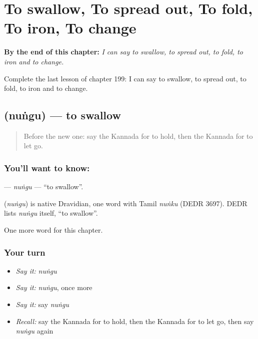 
\chapter{To swallow, To spread out, To fold, To iron, To change}
\label{ch:ka-to-swallow-to-spread-out-to-fold-to-iron-to-change}

\begin{chapteropening}
\textbf{By the end of this chapter:} \emph{I can say to swallow, to spread out, to fold, to iron and to change.}

Complete the last lesson of chapter 199: I can say to swallow, to spread out, to fold, to iron and to change.
\end{chapteropening}

\section[\texorpdfstring{\kn{ನುಂಗು} (nuṅgu)}{ನುಂಗು (nuṅgu)}]{ (nuṅgu) — to swallow}

\label{lesson:KA-C199-nungu}



\begin{quote}
Before the new one: say the Kannada for to hold, then the Kannada for to let go.
\end{quote}

\subsection*{You'll want to know: }
\textbf{} — \emph{nuṅgu} — \textquotedblleft{}to swallow\textquotedblright{}.

\begin{cousinweb}
\textbf{} (\emph{nuṅgu}) is native Dravidian, one word with Tamil \emph{nuṅku} (DEDR 3697). DEDR lists \emph{nuṅgu} itself, \textquotedblleft{}to swallow\textquotedblright{}.
\end{cousinweb}

\begin{grammarlens}[title={What you've built}]
One more word for this chapter.
\end{grammarlens}

\subsection*{Your turn}
\begin{itemize}
\raggedright
  \item \emph{Say it:} \emph{nuṅgu}
  \item \emph{Say it:} \emph{nuṅgu}, once more
  \item \emph{Say it:} say \emph{nuṅgu}
  \item \emph{Recall:} say the Kannada for to hold, then the Kannada for to let go, then say \emph{nuṅgu} again
\end{itemize}

